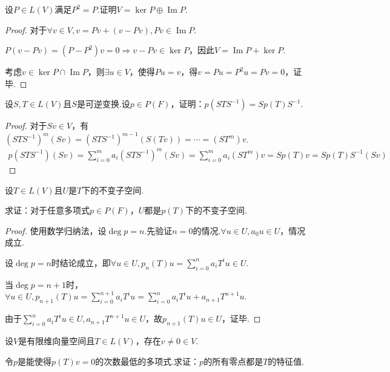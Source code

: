 \begin{problem}[4]\label{5.B.4}
    设\(P \in L(V)\)满足\(P^2=P\).证明\(V=\ker P \oplus \operatorname{Im} P\).
\end{problem}

\begin{proof}
    对于\(\forall v \in V,v=Pv+(v-Pv),Pv \in \operatorname{Im} P\).

    \(P(v-Pv)=(P-P^2)v=0 \Rightarrow v-Pv \in \ker P\)，因此\(V=\operatorname{Im} P+\ker P\).
    
    考虑\(v \in \ker P \cap \operatorname{Im} P\)，则\(\exists u \in V\)，使得\(Pu=v\)，得\(v=Pu=P^2u=Pv=0\)，证毕.
\end{proof}

\begin{problem}[5]\label{5.B.5}
    设\(S,T \in L(V)\)且\(S\)是可逆变换.设\(p \in P(F)\)，证明：\(p(STS^{-1})=Sp(T)S^{-1}\).
\end{problem}

\begin{proof}
    对于\(Sv \in V\)，有\((STS^{-1})^m (Sv)=(STS^{-1})^{m-1}(S(Tv))=\cdots=(ST^m)v\).
    \begin{align*}
        p(STS^{-1})(Sv)=\sum_{i=0}^m a_i(STS^{-1})^m (Sv) 
        =\sum_{i=0}^m a_i(ST^m)v=Sp(T)v=Sp(T)S^{-1}(Sv)
    \end{align*}
\end{proof}

\newpage

\begin{problem}[6]\label{5.B.6}
    设\(T \in L(V)\)且\(U\)是\(T\)下的不变子空间.

    求证：对于任意多项式\(p \in P(F)\)，\(U\)都是\(p(T)\)下的不变子空间.
\end{problem}

\begin{proof}
    使用数学归纳法，设\(\operatorname{deg} p=n\).先验证\(n=0\)的情况.\(\forall u \in U,a_0u \in U\)，情况成立.
    
    设\(\operatorname{deg} p=n\)时结论成立，即\(\forall u \in U,p_n(T)u=\sum_{i=0}^n a_iT^iu \in U\).
    
    当\(\operatorname{deg} p=n+1\)时，\(\forall u \in U,p_{n+1}(T)u=\sum_{i=0}^{n+1} a_iT^iu=\sum_{i=0}^n a_iT^iu+a_{n+1}T^{n+1}u\).
    
    由于\(\sum_{i=0}^n a_iT^iu \in U,a_{n+1}T^{n+1}u \in U\)，故\(p_{n+1}(T)u \in U\)，证毕.
\end{proof}

\begin{problem}[9]\label{5.B.9}
    设\(V\)是有限维向量空间且\(T \in L(V)\)，存在\(v \ne 0 \in V\).

    令\(p\)是能使得\(p(T)v=0\)的次数最低的多项式.求证：\(p\)的所有零点都是\(T\)的特征值.
\end{problem}

